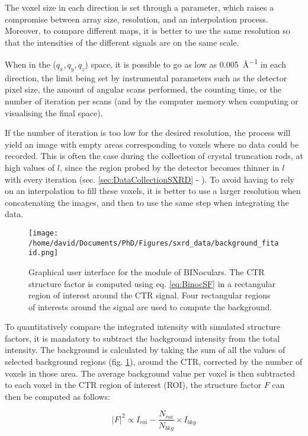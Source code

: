 The voxel size in each direction is set through a parameter, which raises a compromise between array size, resolution, and an interpolation process.
Moreover, to compare different maps, it is better to use the same resolution so that the intensities of the different signals are on the same scale.

When in the ($q_x, q_y, q_z$) space, it is possible to go as low as \qty{0.005}{\angstrom^{-1}} in each direction, the limit being set by instrumental parameters such as the detector pixel size, the amount of angular scans performed, the counting time, or the number of iteration per scans (and by the computer memory when computing or visualising the final space).

If the number of iteration is too low for the desired resolution, the process will yield an image with empty areas corresponding to voxels where no data could be recorded.
This is often the case during the collection of crystal truncation rods, at high values of $l$, since the region probed by the detector becomes thinner in $l$ with every iteration (sec. \ref{sec:DataCollectionSXRD} - \cite{Drnec2014}).
To avoid having to rely on an interpolation to fill these voxels, it is better to use a larger resolution when concatenating the images, and then to use the same step when integrating the data.

\begin{figure}[!htb]
    \texttt{[image: /home/david/Documents/PhD/Figures/sxrd\_data/background\_fitaid.png]}
    \caption{
        Graphical user interface for the  module of BINoculars.
        The CTR structure factor is computed using eq. \ref{eq:BinocSF} in a rectangular region of interest around the CTR signal.
        Four rectangular regions of interests around the signal are used to compute the background.
    }
    \label{fig:BinocularsBackground}
\end{figure}

To quantitatively compare the integrated intensity with simulated structure factors, it is mandatory to subtract the background intensity from the total intensity.
The background is calculated by taking the sum of all the values of selected background regions (fig. \ref{fig:BinocularsBackground}), around the CTR, corrected by the number of voxels in those area.
The average background value per voxel is then subtracted to each voxel in the CTR region of interest (ROI), the structure factor $F$ can then be computed as follows:

\begin{equation}
    |F|^2 \propto I_{roi} - \frac{N_{roi}}{N_{bkg}} \times I_{bkg}
    \label{eq:BinocSF}
\end{equation}

